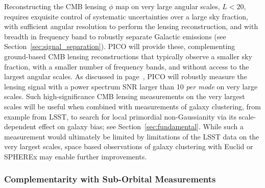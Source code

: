\documentclass[PICOReport.tex]{subfiles}
\begin{document}
Reconstructing the CMB lensing $\phi$ map on very large angular scales, $L<20$, requires exquisite control of systematic uncertainties over a large sky fraction, with sufficient angular resolution to perform the lensing reconstruction, and with breadth in frequency band to robustly separate Galactic emissions (see Section~\ref{sec:signal_separation}). PICO will provide these, complementing ground-based CMB lensing reconstructions that typically observe a smaller sky fraction, with a smaller number of frequency bands, and without access to the largest angular scales. As discussed in page~\pageref{lensing}, PICO will robustly measure the lensing signal with a power spectrum \ac{SNR} larger than 10 {\it per mode} on very large scales. Such high-significance CMB lensing measurements on the very largest scales will be useful when combined with measurements of galaxy clustering, from example from LSST, to search for local primordial non-Gaussianity via its scale-dependent effect on galaxy bias; see Section~\ref{sec:fundamental}.
While such a measurement would ultimately be limited by limitations of the LSST data on the very largest scales, space based observations of galaxy clustering with Euclid or SPHEREx may enable further improvements.


\subsubsection{Complementarity with Sub-Orbital Measurements}

\end{document}
